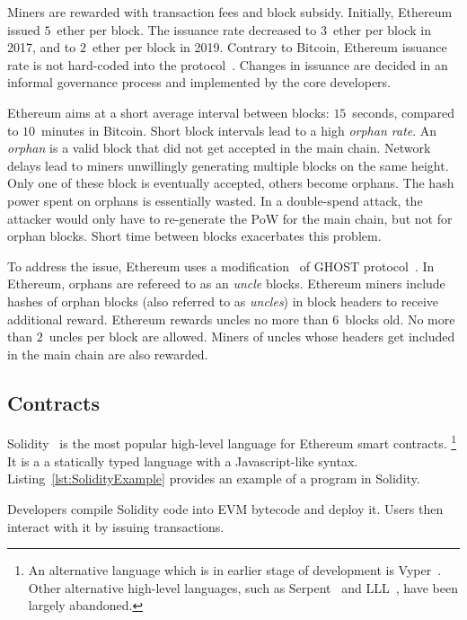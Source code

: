 Miners are rewarded with transaction fees and block subsidy.
Initially, Ethereum issued $5$~ether per block.
The issuance rate decreased to $3$~ether per block in 2017, and to $2$~ether per block in 2019.
Contrary to Bitcoin, Ethereum issuance rate is not hard-coded into the protocol~\cite{Ethhub2020}.
Changes in issuance are decided in an informal governance process and implemented by the core developers.

Ethereum aims at a short average interval between blocks: $15$~seconds, compared to $10$~minutes in Bitcoin.
Short block intervals lead to a high \textit{orphan rate}.
An \textit{orphan} is a valid block that did not get accepted in the main chain.
Network delays lead to miners unwillingly generating multiple blocks on the same height.
Only one of these block is eventually accepted, others become orphans.
The hash power spent on orphans is essentially wasted.
In a double-spend attack, the attacker would only have to re-generate the PoW for the main chain, but not for orphan blocks.
Short time between blocks exacerbates this problem.

To address the issue, Ethereum uses a modification~\cite{Lewenberg2015} of GHOST protocol~\cite{Sompolinsky2013, EthdocsMining}.
In Ethereum, orphans are refereed to as an \textit{uncle} blocks.
Ethereum miners include hashes of orphan blocks (also referred to as \textit{uncles}) in block headers to receive additional reward.
Ethereum rewards uncles no more than $6$~blocks old.
No more than $2$~uncles per block are allowed.
Miners of uncles whose headers get included in the main chain are also rewarded.


\subsection{Contracts}

Solidity~\cite{Solidity17} is the most popular high-level language for Ethereum smart contracts.
\footnote{An alternative language which is in earlier stage of development is Vyper~\cite{Vyper}. Other alternative high-level languages, such as Serpent~\cite{SerpentGithub} and LLL~\cite{Ellison2017}, have been largely abandoned.}
It is a a statically typed language with a Javascript-like syntax.
Listing~\ref{lst:SolidityExample} provides an example of a program in Solidity.

Developers compile Solidity code into EVM bytecode and deploy it.
Users then interact with it by issuing transactions.

